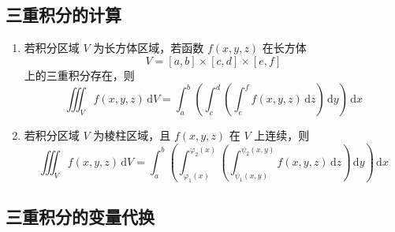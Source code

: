\subsection{三重积分的计算}

\begin{enumerate}
    \item 若积分区域 $V$ 为长方体区域，若函数 $f(x,y,z)$ 在长方体
          \[
              V = [a,b] \times [c,d] \times [e,f]
          \]
          上的三重积分存在，则
          \[
              \iiint_{V} f(x,y,z) \, \mathrm{d}V = \int_{a}^{b} \left( \int_{c}^{d} \left( \int_{e}^{f} f(x,y,z) \, \mathrm{d}z \right) \, \mathrm{d}y \right) \, \mathrm{d}x
          \]
    \item 若积分区域 $V$ 为棱柱区域，且 $f(x,y,z)$ 在 $V$ 上连续，则
          \[
              \iiint_{V} f(x,y,z) \, \mathrm{d}V = \int_{a}^{b} \left( \int_{\varphi_{1}(x)}^{\varphi_{2}(x)} \left( \int_{\psi_{1}(x,y)}^{\psi_{2}(x,y)} f(x,y,z) \, \mathrm{d}z \right) \, \mathrm{d}y \right) \, \mathrm{d}x
          \]
\end{enumerate}

\subsection{三重积分的变量代换}


